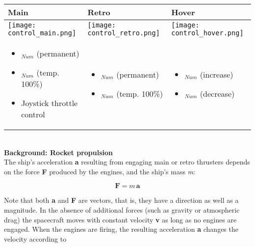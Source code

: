 \documentclass[Orbiter User Manual.tex]{subfiles}
\begin{document}
\begin{table}[H]
	\centering
	\begin{tabular}{ |p{}|p{}|p{}| }
	\hline\rule{0pt}{2ex}
	\textbf{Main} & \textbf{Retro} & \textbf{Hover}\\
	\hline\rule{0pt}{2ex}
		\texttt{[image: control\_main.png]}
	&
		\texttt{[image: control\_retro.png]}
	&
		\texttt{[image: control\_hover.png]}
	\\
	\hline\rule{0pt}{2ex}
		\begin{itemize}[leftmargin=*]
		\item \Ctrl\keystroke{+}$_{Num}$ (permanent)
		\item \keystroke{+}$_{Num}$ (temp. 100\%)
		\item Joystick throttle control
		\end{itemize}
	&
		\begin{itemize}[leftmargin=*]
		\item \Ctrl\keystroke{-}$_{Num}$ (permanent)
		\item \keystroke{-}$_{Num}$ (temp. 100\%)
		\end{itemize}
	&
		\begin{itemize}[leftmargin=*]
		\item \keystroke{0}$_{Num}$ (increase)
		\item \keystroke{.}$_{Num}$ (decrease)
		\end{itemize}
	\\
	\hline
	\end{tabular}
\end{table}

\noindent
\\
\textbf{Background: Rocket propulsion}\\
The ship's acceleration \textbf{a} resulting from engaging main or retro thrusters depends on the force \textbf{F} produced by the engines, and the ship's mass \textit{m}:

\[ \textbf{F} = m \, \textbf{a} \]

\noindent
Note that both \textbf{a} and \textbf{F} are vectors, that is, they have a direction as well as a magnitude. In the absence of additional forces (such as gravity or atmospheric drag) the spacecraft moves with constant velocity \textbf{v} as long as no engines are engaged. When the engines are firing, the resulting acceleration \textbf{a} changes the velocity according to
\end{document}

